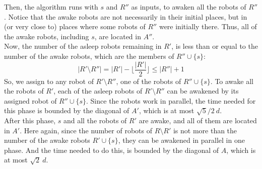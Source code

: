 \documentclass[review]{elsarticle}
\begin{document}
Then, the algorithm runs with $s$ and $R''$ as inputs, to awaken all the robots of $R''$. Notice that the awake robots are not necessarily in their initial places, but in (or very close to) places where some robots of $R''$ were initially there. Thus, all of the awake robots, including $s$, are located in $A''$.\\
Now, the number of the asleep robots remaining in $R'$, is less than or equal to the number of the awake robots, which are the members of $R''\cup\{s\}$:
$$ |R'\setminus R''|=|R'|-\big\lfloor\dfrac{|R'|}{2}\big\rfloor \leq |R''|+1 $$
So, we assign to any robot of $R'\setminus R''$, one of the robots of $R''\cup\{s\}$. To awake all the robots of $R'$, each of the asleep robots of $R'\setminus R''$ can be awakened by its assigned robot of $R''\cup\{s\}$. Since the robots work in parallel, the time needed for this phase is bounded by the diagonal of $A'$, which is at most $\sqrt{5}/2~d$.\\
After this phase, $s$ and all the robots of $R'$ are awake, and all of them are located in $A'$. Here again, since the number of robots of $R\setminus R'$ is not more than the number of the awake robots $R'\cup\{s\}$, they can be awakened in parallel in one phase. And the time needed to do this, is bounded by the diagonal of $A$, which is at most $\sqrt{2}~d$.
\end{document}
